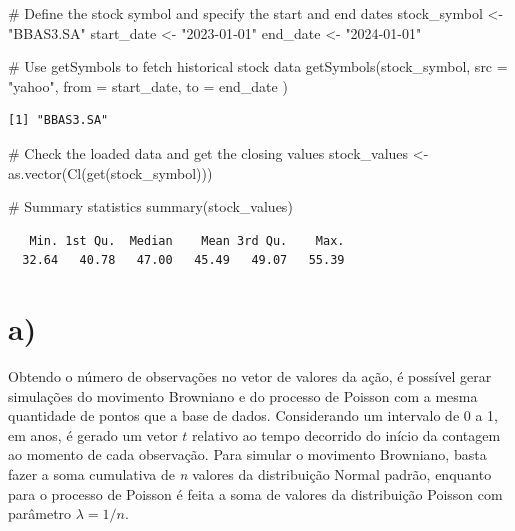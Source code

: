 \documentclass[
  letterpaper,
  DIV=11,
  numbers=noendperiod]{scrreprt}
\newenvironment{Shaded}{\begin{snugshade}}{\end{snugshade}}
\newcommand{\AttributeTok}[1]{\textcolor[rgb]{0.40,0.45,0.13}{#1}}
\newcommand{\CommentTok}[1]{\textcolor[rgb]{0.37,0.37,0.37}{#1}}
\newcommand{\FunctionTok}[1]{\textcolor[rgb]{0.28,0.35,0.67}{#1}}
\newcommand{\NormalTok}[1]{\textcolor[rgb]{0.00,0.23,0.31}{#1}}
\newcommand{\OtherTok}[1]{\textcolor[rgb]{0.00,0.23,0.31}{#1}}
\newcommand{\StringTok}[1]{\textcolor[rgb]{0.13,0.47,0.30}{#1}}
\begin{document}
\begin{Shaded}
\begin{Highlighting}[]
\CommentTok{\# Define the stock symbol and specify the start and end dates}
\NormalTok{stock\_symbol }\OtherTok{\textless{}{-}} \StringTok{"BBAS3.SA"}
\NormalTok{start\_date }\OtherTok{\textless{}{-}} \StringTok{"2023{-}01{-}01"}
\NormalTok{end\_date }\OtherTok{\textless{}{-}} \StringTok{"2024{-}01{-}01"}

\CommentTok{\# Use getSymbols to fetch historical stock data}
\FunctionTok{getSymbols}\NormalTok{(stock\_symbol,}
    \AttributeTok{src =} \StringTok{"yahoo"}\NormalTok{,}
    \AttributeTok{from =}\NormalTok{ start\_date,}
    \AttributeTok{to =}\NormalTok{ end\_date}
\NormalTok{)}
\end{Highlighting}
\end{Shaded}

\begin{verbatim}
[1] "BBAS3.SA"
\end{verbatim}

\begin{Shaded}
\begin{Highlighting}[]
\CommentTok{\# Check the loaded data and get the closing values}
\NormalTok{stock\_values }\OtherTok{\textless{}{-}} \FunctionTok{as.vector}\NormalTok{(}\FunctionTok{Cl}\NormalTok{(}\FunctionTok{get}\NormalTok{(stock\_symbol)))}

\CommentTok{\# Summary statistics}
\FunctionTok{summary}\NormalTok{(stock\_values)}
\end{Highlighting}
\end{Shaded}

\begin{verbatim}
   Min. 1st Qu.  Median    Mean 3rd Qu.    Max. 
  32.64   40.78   47.00   45.49   49.07   55.39 
\end{verbatim}

\hypertarget{a-1}{%
\section*{a)}\label{a-1}}


Obtendo o número de observações no vetor de valores da ação, é possível
gerar simulações do movimento Browniano e do processo de Poisson com a
mesma quantidade de pontos que a base de dados. Considerando um
intervalo de 0 a 1, em anos, é gerado um vetor \(t\) relativo ao tempo
decorrido do início da contagem ao momento de cada observação. Para
simular o movimento Browniano, basta fazer a soma cumulativa de \emph{n}
valores da distribuição Normal padrão, enquanto para o processo de
Poisson é feita a soma de valores da distribuição Poisson com parâmetro
\(\lambda=1/n\).
\end{document}
